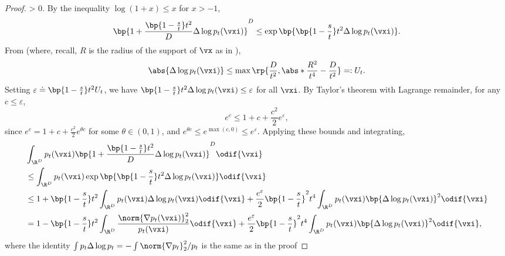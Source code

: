 \documentclass[../../book-main.tex]{subfiles}
\begin{document}
\begin{proof}
     > 0\). By the
    inequality \(\log(1 + x) \leq x\) for \(x > -1\),
    \begin{equation}
        \bp{1 + \frac{\bp{1 - \frac{s}{t}}t^{2}}{D}\Delta \log
        p_{t}(\vxi)}^{D} \leq \exp\bp{\bp{1 -
        \frac{s}{t}}t^{2}\Delta \log p_{t}(\vxi)}.
    \end{equation}
    From  (where, recall,
    \(R\) is the radius of the support of \(\vx\) as in
    ),
    \begin{equation}
        \abs{\Delta \log p_{t}(\vxi)} \leq \max\rp{\frac{D}{t^{2}},
        \abs*{\frac{R^{2}}{t^{4}} - \frac{D}{t^{2}}}} =: U_{t}.
    \end{equation}
    Setting \(\varepsilon \doteq \bp{1 -
    \frac{s}{t}}t^{2}U_{t}\), we have \(\bp{1 -
    \frac{s}{t}}t^{2}\Delta \log p_{t}(\vxi) \leq \varepsilon\)
    for all \(\vxi\). By Taylor's theorem with Lagrange remainder,
    for any \(c \leq \varepsilon\),
    \begin{equation}
        e^{c} \leq 1 + c + \frac{c^{2}}{2}e^{\varepsilon},
    \end{equation}
    since \(e^{c} = 1 + c + \frac{c^{2}}{2}e^{\theta c}\) for some
    \(\theta \in (0, 1)\), and
    \(e^{\theta c} \leq e^{\max(c, 0)} \leq e^{\varepsilon}\).
    Applying these bounds and integrating,
    \begin{align}
        &\int_{\R^{D}} p_{t}(\vxi)\bp{1 + \frac{\bp{1 -
        \frac{s}{t}}t^{2}}{D}\Delta \log
        p_{t}(\vxi)}^{D}\odif{\vxi} \\
        &\leq \int_{\R^{D}} p_{t}(\vxi)\exp\bp{\bp{1 -
        \frac{s}{t}}t^{2}\Delta \log
        p_{t}(\vxi)}\odif{\vxi} \\
        &\leq 1 + \bp{1 - \frac{s}{t}}t^{2}\int_{\R^{D}}
        p_{t}(\vxi)\Delta \log p_{t}(\vxi)\odif{\vxi}
        + \frac{e^{\varepsilon}}{2}\bp{1 -
        \frac{s}{t}}^{2}t^{4}\int_{\R^{D}}p_{t}(\vxi)\bp{\Delta
        \log p_{t}(\vxi)}^{2}\odif{\vxi} \\
        &= 1 - \bp{1 -
        \frac{s}{t}}t^{2}\int_{\R^{D}}\frac{\norm{\nabla
        p_{t}(\vxi)}_{2}^{2}}{p_{t}(\vxi)}\odif{\vxi}
        + \frac{e^{\varepsilon}}{2}\bp{1 -
        \frac{s}{t}}^{2}t^{4}\int_{\R^{D}}p_{t}(\vxi)\bp{\Delta
        \log p_{t}(\vxi)}^{2}\odif{\vxi},
    \end{align}
    where the identity \(\int p_{t}\Delta \log p_{t} = -\int
    \norm{\nabla p_{t}}_{2}^{2}/p_{t}\) is the same as in the proof

\end{proof}
\end{document}
